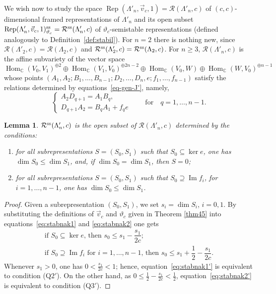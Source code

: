 \documentclass[pdftex]{sigma}
\numberwithin{equation}{section}
\newtheorem{Lemma}[Theorem]{Lemma}
\begin{document}
We wish now to study the space $\operatorname{Rep}(\Lambda'_n, \vec{v}_c, 1) = \mathcal{R}(\Lambda'_n, c)$
of $(c,c)$-dimensional framed representations of $\Lambda'_{n}$ and its open subset
 $\operatorname{Rep}(\Lambda'_n, \vec{v}_c, 1)_{\vartheta_c}^{\rm ss} = \mathcal{R}^{\rm ss}(\Lambda'_n, c)$ of $\vartheta_c$-semistable representations
 (defined analogously to Definition~\ref{def:stabil}).
 For $n=2$ there is nothing new, since
 $\mathcal{R}(\Lambda'_2, c)=\mathcal{R}(\Lambda_2, c)$ and $\mathcal{R}^{\rm ss}(\Lambda'_2, c) = \mathcal{R}^{\rm ss}(\Lambda_2, c)$.
 For $n\geq3$, $\mathcal{R}(\Lambda'_n, c)$ is the affine subvariety of the vector space
\begin{equation*}
\operatorname{Hom}_\mathbb{C}(V_0,V_1)^{\oplus 2}\oplus\operatorname{Hom}_\mathbb{C}(V_1,V_0)^{\oplus 2n-2}\oplus\operatorname{Hom}_\mathbb{C}(V_0,W)\oplus\operatorname{Hom}_\mathbb{C}(W,V_0)^{\oplus n-1}
\end{equation*}
whose points $(A_1,A_2;B_1,\dots,B_{n-1};D_{2},\dots,D_{n},e;f_1,\dots,f_{n-1})$ satisfy the relations
determined by equations~\eqref{eq-gen-J'}, namely,
\begin{equation}
\begin{cases}
A_2D_{q+1}=A_1B_q,\\
D_{q+1}A_2=B_qA_1+f_{q}e
\end{cases}\qquad\text{for}\quad q=1,\dots,n-1 .
\label{eq-(Q1')}\tag{\rm Q$1'$}
\end{equation}

\begin{Lemma}\label{Q-Lemma}
$\mathcal{R}^{\rm ss}(\Lambda'_{n}, c)$ is the open subset of $\mathcal{R}(\Lambda'_{n}, c)$ determined by the conditions:
\begin{enumerate}\itemsep=0pt
 \item[\rm{(Q$2'$)}]
 for all subrepresentations $S=(S_0,S_1)$ such that $S_0\subseteq\ker e$, one has $\dim S_0\leq\dim S_1$, and, if $\dim S_0=\dim S_1$, then $S=0$;
 \item[\rm{(Q$3'$)}]
 for all subrepresentations $S=(S_0,S_1)$ such that $S_0\supseteq\operatorname{Im} f_i$, for $i=1,\dots,n-1$, one has $\dim S_0\leq\dim S_1$.
\end{enumerate}
\end{Lemma}
\begin{proof}
Given a subrepresentation $(S_{0},S_{1})$, we set $s_{i}=\dim S_{i}$, $i=0,1$. By substituting the definitions of $\vec{v}_c$ and $\vartheta_c$ given in Theorem \ref{thm45} into equations~\eqref{eq:stabnak1} and \eqref{eq:stabnak2} one gets
\begin{gather}
 \text{if $S_0\subseteq \ker e$, then $s_{0}\leq s_1-\dfrac{s_1}{2c}$} ;\label{eq:stabnak1'}\\
\text{if $S_0\supseteq \operatorname{Im} f_i$ for $i=1,\dots,n-1$, then $s_{0}\leq s_{1}+\dfrac{1}{2}-\dfrac{s_{1}}{2c}$} .\label{eq:stabnak2'}
\end{gather}
Whenever $s_1>0$, one has $0<\frac{s_1}{2c}<1$; hence, equation~\eqref{eq:stabnak1'} is equivalent to condition \rm{(Q$2'$)}. On the other hand, as $0\leq\frac{1}{2}-\frac{s_{1}}{2c}<\frac{1}{2}$, equation~\eqref{eq:stabnak2'} is equivalent to condition \rm{(Q$3'$)}.
\end{proof}
\end{document}
